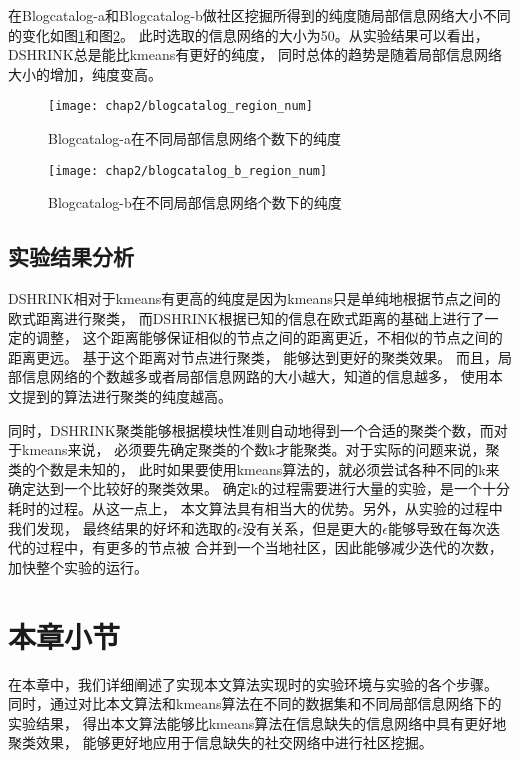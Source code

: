 在Blogcatalog-a和Blogcatalog-b做社区挖掘所得到的纯度随局部信息网络大小不同的变化如图\ref{fig:region_num:a}和图\ref{fig:region_num:b}。
此时选取的信息网络的大小为50。从实验结果可以看出，DSHRINK总是能比kmeans有更好的纯度，
同时总体的趋势是随着局部信息网络大小的增加，纯度变高。

\begin{figure}
    \texttt{[image: chap2/blogcatalog\_region\_num]}
    \caption{Blogcatalog-a在不同局部信息网络个数下的纯度}
    \label{fig:region_num:a}
\end{figure}

\begin{figure}
    \texttt{[image: chap2/blogcatalog\_b\_region\_num]}
    \caption{Blogcatalog-b在不同局部信息网络个数下的纯度}
    \label{fig:region_num:b}
\end{figure}

\subsection{实验结果分析}

DSHRINK相对于kmeans有更高的纯度是因为kmeans只是单纯地根据节点之间的欧式距离进行聚类，
而DSHRINK根据已知的信息在欧式距离的基础上进行了一定的调整，
这个距离能够保证相似的节点之间的距离更近，不相似的节点之间的距离更远。
基于这个距离对节点进行聚类，
能够达到更好的聚类效果。
而且，局部信息网络的个数越多或者局部信息网路的大小越大，知道的信息越多，
使用本文提到的算法进行聚类的纯度越高。

同时，DSHRINK聚类能够根据模块性准则自动地得到一个合适的聚类个数，而对于kmeans来说，
必须要先确定聚类的个数k才能聚类。对于实际的问题来说，聚类的个数是未知的，
此时如果要使用kmeans算法的，就必须尝试各种不同的k来确定达到一个比较好的聚类效果。
确定k的过程需要进行大量的实验，是一个十分耗时的过程。从这一点上，
本文算法具有相当大的优势。另外，从实验的过程中我们发现，
最终结果的好坏和选取的$\epsilon$没有关系，但是更大的$\epsilon$能够导致在每次迭代的过程中，有更多的节点被
合并到一个当地社区，因此能够减少迭代的次数，加快整个实验的运行。

\section{本章小节}

在本章中，我们详细阐述了实现本文算法实现时的实验环境与实验的各个步骤。
同时，通过对比本文算法和kmeans算法在不同的数据集和不同局部信息网络下的实验结果，
得出本文算法能够比kmeans算法在信息缺失的信息网络中具有更好地聚类效果，
能够更好地应用于信息缺失的社交网络中进行社区挖掘。
